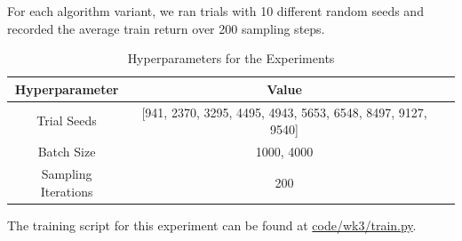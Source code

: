 \documentclass{article} %
\begin{document}
For each algorithm variant, we ran trials with 10 different random seeds
and recorded the average train return over 200 sampling steps.
\begin{table}[h] \label{tab:hyperparameters}
    \centering
    \begin{tabular}{ccc}
        \toprule
        Hyperparameter & Value \\
        \midrule
        Trial Seeds & [941, 2370, 3295, 4495, 4943, 5653, 6548, 8497, 9127, 9540] \\
        Batch Size & {1000, 4000} \\
        Sampling Iterations & 200 \\
        \bottomrule
    \end{tabular}
    \caption{Hyperparameters for the Experiments}
    \label{tab:hyperparameters}
\end{table}

The training script for this experiment can be found at \href{code/wk3/train.py}{code/wk3/train.py}.
\end{document}
